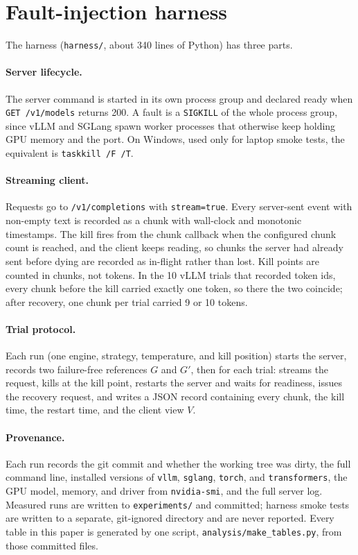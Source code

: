 \documentclass[10pt,twocolumn]{article}
\begin{document}
\section{Fault-injection harness}
\label{sec:harness}

The harness (\texttt{harness/}, about 340 lines of Python) has three parts.

\paragraph{Server lifecycle.} The server command is started in its own process
group and declared ready when \texttt{GET /v1/models} returns 200. A fault is a
\texttt{SIGKILL} of the whole process group, since vLLM and SGLang spawn worker
processes that otherwise keep holding GPU memory and the port. On Windows,
used only for laptop smoke tests, the equivalent is \texttt{taskkill /F /T}.

\paragraph{Streaming client.} Requests go to \texttt{/v1/completions} with
\texttt{stream=true}. Every server-sent event with non-empty text is recorded
as a chunk with wall-clock and monotonic timestamps. The kill fires from the
chunk callback when the configured chunk count is reached, and the client
keeps reading, so chunks the server had already sent before dying are recorded
as in-flight rather than lost. Kill points are counted in chunks, not tokens. In
the 10 vLLM trials that recorded token ids, every chunk before the kill
carried exactly one token, so there the two coincide; after recovery, one
chunk per trial carried 9 or 10 tokens.

\paragraph{Trial protocol.} Each run (one engine, strategy, temperature, and
kill position) starts the server, records two failure-free references $G$ and
$G'$, then for each trial: streams the request, kills at the kill point,
restarts the server and waits for readiness, issues the recovery request,
and writes a JSON record containing every chunk, the kill time, the restart
time, and the client view $V$.

\paragraph{Provenance.} Each run records the git commit and whether the
working tree was dirty, the full command line, installed versions of
\texttt{vllm}, \texttt{sglang}, \texttt{torch}, and \texttt{transformers}, the
GPU model, memory, and driver from \texttt{nvidia-smi}, and the full server
log. Measured runs are written to \texttt{experiments/} and committed; harness
smoke tests are written to a separate, git-ignored directory and are never
reported. Every table in this paper is generated by one script,
\texttt{analysis/make\_tables.py}, from those committed files.
\end{document}
